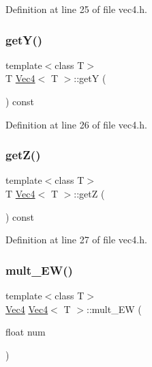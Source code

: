 Definition at line 25 of file vec4.\+h.

\mbox{\label{class_vec4_aa75327d1d4c22bea8ce2857708ed2b72}} 
\subsubsection{\texorpdfstring{getY()}{getY()}}
{\footnotesize\ttfamily template$<$class T$>$ \\
T \mbox{\hyperlink{class_vec4}{Vec4}}$<$ T $>$\+::getY (\begin{DoxyParamCaption}{ }\end{DoxyParamCaption}) const\hspace{0.3cm}{\ttfamily [inline]}}



Definition at line 26 of file vec4.\+h.

\mbox{\label{class_vec4_a21606d1d8d9adb1d2140f080fe1c6340}} 
\subsubsection{\texorpdfstring{getZ()}{getZ()}}
{\footnotesize\ttfamily template$<$class T$>$ \\
T \mbox{\hyperlink{class_vec4}{Vec4}}$<$ T $>$\+::getZ (\begin{DoxyParamCaption}{ }\end{DoxyParamCaption}) const\hspace{0.3cm}{\ttfamily [inline]}}



Definition at line 27 of file vec4.\+h.

\mbox{\label{class_vec4_ae00aafd1981b6ae5b1bbf428c4bf9570}} 
\subsubsection{\texorpdfstring{mult\_EW()}{mult\_EW()}\hspace{0.1cm}{\footnotesize\ttfamily [1/2]}}
{\footnotesize\ttfamily template$<$class T$>$ \\
\mbox{\hyperlink{class_vec4}{Vec4}} \mbox{\hyperlink{class_vec4}{Vec4}}$<$ T $>$\+::mult\+\_\+\+EW (\begin{DoxyParamCaption}\item[{float}]{num }\end{DoxyParamCaption})\hspace{0.3cm}{\ttfamily [inline]}}



